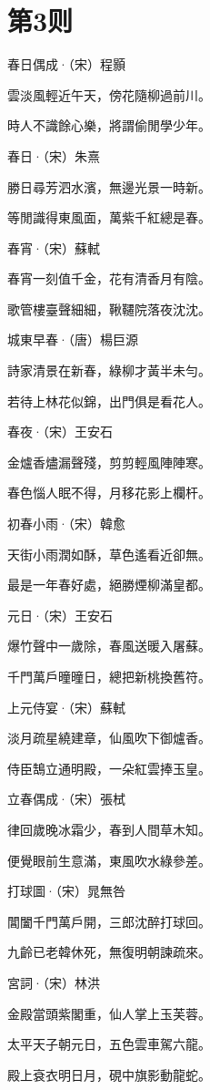 \documentclass[12pt,a4paper]{ctexbook}
\begin{document}
\section{第3则}
春日偶成·（宋）程顥\par
雲淡風輕近午天，傍花隨柳過前川。\par
時人不識餘心樂，將謂偷閒學少年。\par
春日·（宋）朱熹\par
勝日尋芳泗水濱，無邊光景一時新。\par
等閒識得東風面，萬紫千紅總是春。\par
春宵·（宋）蘇軾\par
春宵一刻值千金，花有清香月有陰。\par
歌管樓臺聲細細，鞦韆院落夜沈沈。\par
城東早春·（唐）楊巨源\par
詩家清景在新春，綠柳才黃半未勻。\par
若待上林花似錦，出門俱是看花人。\par
春夜·（宋）王安石\par
金爐香燼漏聲殘，剪剪輕風陣陣寒。\par
春色惱人眠不得，月移花影上欄杆。\par
初春小雨·（宋）韓愈\par
天街小雨潤如酥，草色遙看近卻無。\par
最是一年春好處，絕勝煙柳滿皇都。\par
元日·（宋）王安石\par
爆竹聲中一歲除，春風送暖入屠蘇。\par
千門萬戶曈曈日，總把新桃換舊符。\par
上元侍宴·（宋）蘇軾\par
淡月疏星繞建章，仙風吹下御爐香。\par
侍臣鵠立通明殿，一朵紅雲捧玉皇。\par
立春偶成·（宋）張栻\par
律回歲晚冰霜少，春到人間草木知。\par
便覺眼前生意滿，東風吹水綠參差。\par
打球圖·（宋）晁無咎\par
閶闔千門萬戶開，三郎沈醉打球回。\par
九齡已老韓休死，無復明朝諫疏來。\par
宮詞·（宋）林洪\par
金殿當頭紫閣重，仙人掌上玉芙蓉。\par
太平天子朝元日，五色雲車駕六龍。\par
殿上袞衣明日月，硯中旗影動龍蛇。\par
\end{document}
